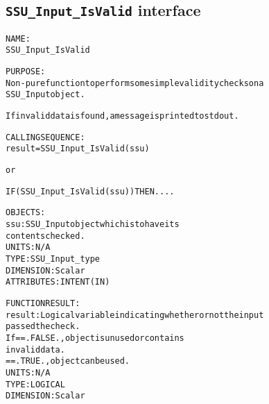 \subsection{\texttt{SSU\_Input\_IsValid} interface}
  \label{sec:SSU_Input_IsValid_interface}
  \begin{alltt}
 
  NAME:
        SSU_Input_IsValid
 
  PURPOSE:
        Non-pure function to perform some simple validity checks on a
        SSU_Input object.
 
        If invalid data is found, a message is printed to stdout.
 
  CALLING SEQUENCE:
        result = SSU_Input_IsValid( ssu )
 
          or
 
        IF ( SSU_Input_IsValid( ssu ) ) THEN....
 
  OBJECTS:
        ssu:       SSU_Input object which is to have its
                   contents checked.
                   UNITS:      N/A
                   TYPE:       SSU_Input_type
                   DIMENSION:  Scalar
                   ATTRIBUTES: INTENT(IN)
 
  FUNCTION RESULT:
        result:    Logical variable indicating whether or not the input
                   passed the check.
                   If == .FALSE., object is unused or contains
                                  invalid data.
                      == .TRUE.,  object can be used.
                   UNITS:      N/A
                   TYPE:       LOGICAL
                   DIMENSION:  Scalar
 
  \end{alltt}
